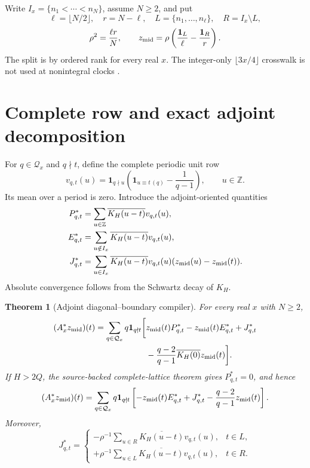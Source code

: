 \documentclass[10pt]{article}
\newtheorem{theorem}{Theorem}
\newcommand{\Z}{\mathbb Z}
\newcommand{\one}{\mathbf 1}
\newcommand{\zm}{z_{\rm mid}}
\newcommand{\Ax}{A_x}
\newcommand{\Qx}{\mathcal Q_x}
\begin{document}
Write $I_x=\{n_1<\cdots<n_N\}$, assume $N\geq2$, and put
\begin{equation}
 \ell=\lfloor N/2\rfloor,\quad r=N-\ell,
 \quad L=\{n_1,\ldots,n_\ell\},\quad R=I_x\setminus L,           \label{eq:rank}
\end{equation}
\begin{equation}
 \rho^2=\frac{\ell r}{N},\qquad
 \zm=\rho\left(\frac{\one_L}{\ell}-\frac{\one_R}{r}\right).  \label{eq:haar}
\end{equation}
The split is by ordered rank for every real $x$.  The integer-only
$\lfloor3x/4\rfloor$ crosswalk is not used at nonintegral clocks
\cite{tpc253}.

\section{Complete row and exact adjoint decomposition}

For $q\in\Qx$ and $q\nmid t$, define the complete periodic unit row
\begin{equation}
 v_{q,t}(u)=\one_{q\nmid u}
 \left(\one_{u\equiv t\,(q)}-\frac1{q-1}\right),\qquad u\in\Z. \label{eq:v}
\end{equation}
Its mean over a period is zero.  Introduce the adjoint-oriented quantities
\begin{align}
 P^*_{q,t}&=\sum_{u\in\Z}\overline{K_H(u-t)}v_{q,t}(u),          \label{eq:p}\\
 E^*_{q,t}&=\sum_{u\notin I_x}\overline{K_H(u-t)}v_{q,t}(u),    \label{eq:e}\\
 J^*_{q,t}&=\sum_{u\in I_x}\overline{K_H(u-t)}v_{q,t}(u)
                   (\zm(u)-\zm(t)).                             \label{eq:j}
\end{align}
Absolute convergence follows from the Schwartz decay of $K_H$.

\begin{theorem}[Adjoint diagonal--boundary compiler]\label{thm:compiler}
For every real $x$ with $N\geq2$,
\begin{align}
 (\Ax^*\zm)(t)=\sum_{q\in\Qx}q\one_{q\nmid t}
 \bigg[&\zm(t)P^*_{q,t}-\zm(t)E^*_{q,t}+J^*_{q,t} \notag\\
 &-\frac{q-2}{q-1}\overline{K_H(0)}\zm(t)\bigg].               \label{eq:full}
\end{align}
If $H>2Q$, the source-backed complete-lattice theorem gives
$P^*_{q,t}=0$, and hence
\begin{equation}
 (\Ax^*\zm)(t)=\sum_{q\in\Qx}q\one_{q\nmid t}
 \left[-\zm(t)E^*_{q,t}+J^*_{q,t}-\frac{q-2}{q-1}\zm(t)\right].\label{eq:reduced}
\end{equation}
Moreover,
\begin{equation}
 J^*_{q,t}=\begin{cases}
 -\rho^{-1}\displaystyle\sum_{u\in R}\overline{K_H(u-t)}v_{q,t}(u),&t\in L,\\[2mm]
 +\rho^{-1}\displaystyle\sum_{u\in L}\overline{K_H(u-t)}v_{q,t}(u),&t\in R.
 \end{cases}                                                     \label{eq:jump}
\end{equation}
\end{theorem}
\end{document}
